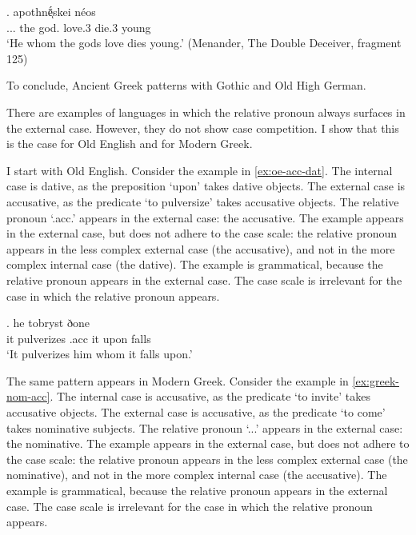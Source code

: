 \exg.     apothnḗͅskei néos\\
... the god. love.3 die.3 young\\
`He whom the gods love dies young.' (Menander, The Double Deceiver, fragment 125)\label{ex:ancient-greek}

To conclude, Ancient Greek patterns with Gothic and Old High German.

There are examples of languages in which the relative pronoun always surfaces in the external case. However, they do not show case competition.
I show that this is the case for Old English and for Modern Greek.

I start with Old English.
Consider the example in \ref{ex:oe-acc-dat}.
The internal case is dative, as the preposition  `upon' takes dative objects.
The external case is accusative, as the predicate  `to pulversize' takes accusative objects.
The relative pronoun  `.\ac{acc}.' appears in the external case: the accusative.
The example appears in the external case, but does not adhere to the case scale: the relative pronoun appears in the less complex external  case (the accusative), and not in the more complex internal case (the dative).
The example is grammatical, because the relative pronoun appears in the external case. The case scale is irrelevant for the case in which the relative pronoun appears.

\exg. he tobryst ðone    \\
 it pulverizes\scsub{[acc]} .\ac{acc}  it upon\scsub{[dat]} falls\\
`It pulverizes him whom it falls upon.'  \label{ex:oe-acc-dat}

The same pattern appears in Modern Greek.
Consider the example in \ref{ex:greek-nom-acc}.
The internal case is accusative, as the predicate  `to invite' takes accusative objects.
The external case is accusative, as the predicate  `to come' takes nominative subjects.
The relative pronoun  `...' appears in the external case: the nominative.
The example appears in the external case, but does not adhere to the case scale: the relative pronoun appears in the less complex external  case (the nominative), and not in the more complex internal case (the accusative).
The example is grammatical, because the relative pronoun appears in the external case. The case scale is irrelevant for the case in which the relative pronoun appears.

